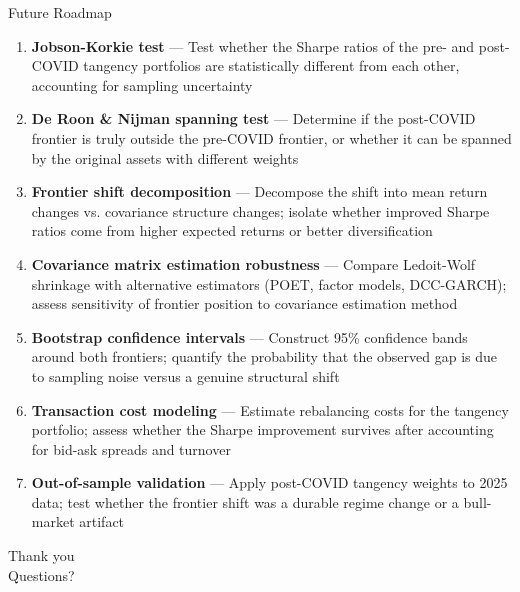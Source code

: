 \documentclass[aspectratio=169]{beamer}
\begin{document}
\begin{frame}{Future Roadmap}
  \footnotesize
  \begin{enumerate}
    \item \textbf{Jobson-Korkie test} --- Test whether the Sharpe ratios of the pre- and post-COVID tangency portfolios are statistically different from each other, accounting for sampling uncertainty
    \vspace{0.25em}
    
    \item \textbf{De Roon \& Nijman spanning test} --- Determine if the post-COVID frontier is truly outside the pre-COVID frontier, or whether it can be spanned by the original assets with different weights
    \vspace{0.25em}
    
    \item \textbf{Frontier shift decomposition} --- Decompose the shift into mean return changes vs. covariance structure changes; isolate whether improved Sharpe ratios come from higher expected returns or better diversification
    \vspace{0.25em}
    
    \item \textbf{Covariance matrix estimation robustness} --- Compare Ledoit-Wolf shrinkage with alternative estimators (POET, factor models, DCC-GARCH); assess sensitivity of frontier position to covariance estimation method
    \vspace{0.25em}
    
    \item \textbf{Bootstrap confidence intervals} --- Construct 95\% confidence bands around both frontiers; quantify the probability that the observed gap is due to sampling noise versus a genuine structural shift
    \vspace{0.25em}
    
    \item \textbf{Transaction cost modeling} --- Estimate rebalancing costs for the tangency portfolio; assess whether the Sharpe improvement survives after accounting for bid-ask spreads and turnover
    \vspace{0.25em}
    
    \item \textbf{Out-of-sample validation} --- Apply post-COVID tangency weights to 2025 data; test whether the frontier shift was a durable regime change or a bull-market artifact
  \end{enumerate}
\end{frame}
\begin{frame}[standout]
  Thank you\\[0.5em]
  \normalsize Questions?
\end{frame}
\end{document}
